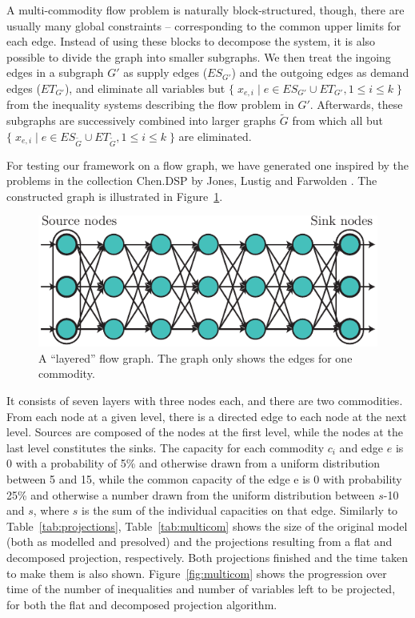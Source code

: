 \documentclass[citeauthoryear]{llncs}
\newcommand{\mi}{\mathit}
\begin{document}
A multi-commodity flow problem is naturally block-structured, though, there are usually many global constraints -- corresponding to the common upper limits for each edge. Instead of using these blocks to decompose the system, it is also possible to divide the graph into smaller subgraphs. We then treat the ingoing edges in a subgraph $G'$ as supply edges ($\mi{ES}_{G'}$) and the outgoing edges as demand edges ($\mi{ET}_{G'}$), and eliminate all variables but $\{\;x_{e,i}\;|\; e\in \mi{ES}_{G'}\cup \mi{ET}_{G'}, 1\leq i\leq k\;\}$ from the inequality systems describing the flow problem in $G'$. Afterwards, these subgraphs are successively combined into larger graphs $\tilde{G}$ from which all but $\{\;x_{e,i}\;|\; e\in \mi{ES}_{\tilde{G}} \cup \mi{ET}_{\tilde{G}}, 1\leq i\leq k\;\}$ are eliminated. 

For testing our framework on a flow graph, we have generated one inspired by the problems in the collection Chen.DSP by Jones, Lustig and Farwolden \cite{JLFP93}. The constructed graph is illustrated in Figure~\ref{fig:multiflow}. 

\begin{figure}[htbp]
	\centering
		\includegraphics{figures/multiflow.pdf}
	\caption{A ``layered'' flow graph. The graph only shows the edges for one commodity.}
	\label{fig:multiflow}
\end{figure}

It consists of seven layers with three nodes each, and there are two commodities. From each node at a given level, there is a directed edge to each node at the next level. Sources are composed of the nodes at the first level, while the nodes at the last level constitutes the sinks. The capacity for each commodity $c_i$ and edge $e$ is 0 with a probability of 5\% and otherwise drawn from a uniform distribution between 5 and 15, while the common capacity of the edge e is 0 with probability 25\% and otherwise a number drawn from the uniform distribution between $s$-10 and $s$, where $s$ is the sum of the individual capacities on that edge. Similarly to Table~\ref{tab:projections}, Table~\ref{tab:multicom} shows the size of the original model (both as modelled and presolved) and the projections resulting from a flat and decomposed projection, respectively. Both projections finished and the time taken to make them is also shown. Figure~\ref{fig:multicom} shows the progression over time of the number of inequalities and number of variables left to be projected, for both the flat and decomposed projection algorithm.
\end{document}
